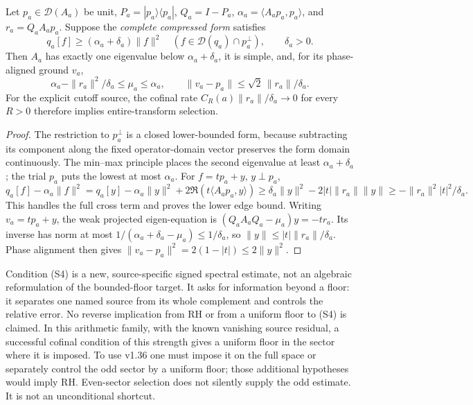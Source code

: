 \begin{proposition}
\label{prop:ns43-ccm-source-separation}
Let $p_a\in\mathcal D(A_a)$ be unit, $P_a=|p_a\rangle\langle p_a|$,
$Q_a=I-P_a$, $\alpha_a=\langle A_ap_a,p_a\rangle$, and
$r_a=Q_aA_ap_a$. Suppose the \emph{complete compressed form} satisfies
\[
 q_a[f]\ge(\alpha_a+\delta_a)\|f\|^2
 \quad(f\in\mathcal D(q_a)\cap p_a^\perp),\qquad \delta_a>0.
 \tag{S4}
\]
Then $A_a$ has exactly one eigenvalue below $\alpha_a+\delta_a$,
it is simple, and, for its phase-aligned ground $v_a$,
\[
 \alpha_a-\|r_a\|^2/\delta_a\le\mu_a\le\alpha_a,
 \qquad \|v_a-p_a\|\le\sqrt2\,\|r_a\|/\delta_a.
\]
For the explicit cutoff source, the cofinal rate
$C_R(a)\|r_a\|/\delta_a\to0$ for every $R>0$ therefore implies
entire-transform selection.
\end{proposition}
\begin{proof}
The restriction to $p_a^\perp$ is a closed lower-bounded form,
because subtracting its component along the fixed operator-domain
vector preserves the form domain continuously. The min--max principle
places the second eigenvalue at least $\alpha_a+\delta_a$; the trial
$p_a$ puts the lowest at most $\alpha_a$. For $f=tp_a+y$, $y\perp p_a$,
\[
 q_a[f]-\alpha_a\|f\|^2
 =q_a[y]-\alpha_a\|y\|^2+2\Re(t\langle A_ap_a,y\rangle)
 \ge\delta_a\|y\|^2-2|t|\|r_a\|\|y\|
 \ge-\|r_a\|^2|t|^2/\delta_a.
\]
This handles the full cross term and proves the lower edge bound.
Writing $v_a=tp_a+y$, the weak projected eigen-equation is
$(Q_aA_aQ_a-\mu_a)y=-tr_a$. Its inverse has norm at most
$1/(\alpha_a+\delta_a-\mu_a)\le1/\delta_a$, so
$\|y\|\le|t|\|r_a\|/\delta_a$. Phase alignment then gives
$\|v_a-p_a\|^2=2(1-|t|)\le2\|y\|^2$.
\end{proof}
Condition (S4) is a new, source-specific signed spectral estimate,
not an algebraic reformulation of the bounded-floor target. It asks for information beyond a floor: it separates one named source
from its whole complement and controls the relative error. No reverse
implication from RH or from a uniform floor to (S4) is claimed. In this
arithmetic family, with the known vanishing source residual, a successful
cofinal condition of this strength gives a uniform floor in the sector
where it is imposed. To use v1.36 one must impose it on the full space
or separately control the odd sector by a uniform floor; those additional
hypotheses would imply RH. Even-sector selection does not silently supply
the odd estimate. It is not an unconditional shortcut.

